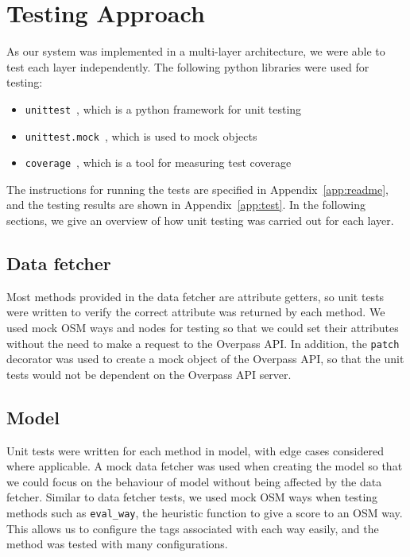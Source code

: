 \documentclass[12pt,a4paper]{report}
\begin{document}
\section{Testing Approach}\label{sec:testing}
As our system was implemented in a multi-layer architecture, we were able to test each layer independently. The following python libraries were used for testing:
\begin{itemize}
    \item \texttt{unittest}~\cite{unittest}, which is a python framework for unit testing
    \item \texttt{unittest.mock}~\cite{unittest:mock}, which is used to mock objects
    \item \texttt{coverage}~\cite{coverage}, which is a tool for measuring test coverage
\end{itemize}

The instructions for running the tests are specified in Appendix~\ref{app:readme}, and the testing results are shown in Appendix~\ref{app:test}. In the following sections, we give an overview of how unit testing was carried out for each layer.

\subsection{Data fetcher}
Most methods provided in the data fetcher are attribute getters, so unit tests were written to verify the correct attribute was returned by each method. We used mock OSM ways and nodes for testing so that we could set their attributes without the need to make a request to the Overpass API. In addition, the \texttt{patch} decorator was used to create a mock object of the Overpass API, so that the unit tests would not be dependent on the Overpass API server.

\subsection{Model}
Unit tests were written for each method in model, with edge cases considered where applicable. A mock data fetcher was used when creating the model so that we could focus on the behaviour of model without being affected by the data fetcher. Similar to data fetcher tests, we used mock OSM ways when testing methods such as \texttt{eval\_way}, the heuristic function to give a score to an OSM way. This allows us to configure the tags associated with each way easily, and the method was tested with many configurations.
\end{document}
